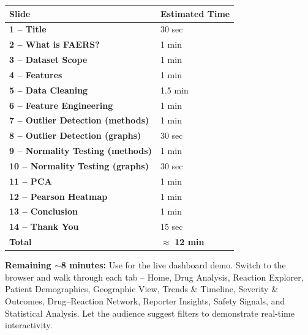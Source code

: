 \documentclass[12pt, letterpaper]{article}
\begin{document}
\begin{center}
\begin{tabular}{>{\bfseries}l l}
\toprule
Slide & Estimated Time \\
\midrule
1 -- Title              & 30 sec \\
2 -- What is FAERS?     & 1 min  \\
3 -- Dataset Scope      & 1 min  \\
4 -- Features           & 1 min  \\
5 -- Data Cleaning      & 1.5 min \\
6 -- Feature Engineering & 1 min  \\
7 -- Outlier Detection (methods) & 1 min \\
8 -- Outlier Detection (graphs)  & 30 sec \\
9 -- Normality Testing (methods) & 1 min \\
10 -- Normality Testing (graphs) & 30 sec \\
11 -- PCA               & 1 min  \\
12 -- Pearson Heatmap   & 1 min  \\
13 -- Conclusion        & 1 min  \\
14 -- Thank You         & 15 sec \\
\midrule
\textbf{Total}          & $\approx$ \textbf{12 min} \\
\bottomrule
\end{tabular}
\end{center}

\vspace{6pt}
\begin{notebox}
\textbf{Remaining $\sim$8 minutes:} Use for the live dashboard demo.
Switch to the browser and walk through each tab -- Home, Drug Analysis,
Reaction Explorer, Patient Demographics, Geographic View, Trends \& Timeline,
Severity \& Outcomes, Drug--Reaction Network, Reporter Insights, Safety Signals,
and Statistical Analysis. Let the audience suggest filters to demonstrate
real-time interactivity.
\end{notebox}
\end{document}
